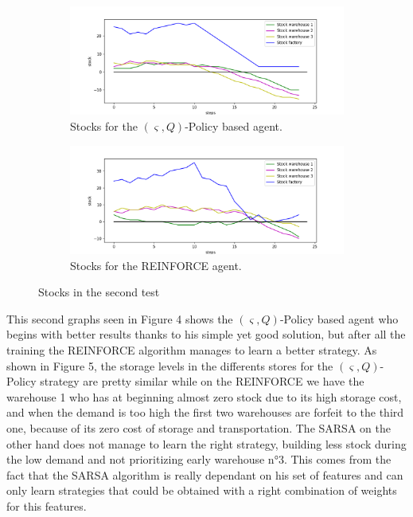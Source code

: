 \documentclass[journal, a4paper]{IEEEtran}
\theoremstyle{plain}
\theoremstyle{definition}
\begin{document}
\begin{figure}
	\raggedleft
	\begin{subfigure}[b]{0.5\textwidth}
		\includegraphics[width=1\columnwidth]{reinforce_stocks.png}
		\caption{Stocks for the $(\varsigma, Q)$-Policy based agent.}
		\label{reinforce_stocks}
	\end{subfigure}
	\begin{subfigure}[b]{0.5\textwidth}
		\includegraphics[width=1\columnwidth]{s_q_stocks.png}
		\caption{ Stocks for the REINFORCE agent.}
		\label{s_q_stocks}
	\end{subfigure}
	\caption{Stocks in the second test}\label{fig:animals}
	 \vspace{-10pt}
\end{figure}
This second graphs seen in Figure 4 shows the $(\varsigma, Q)$-Policy based agent who begins with better results thanks to his simple yet good solution, but after all the training the REINFORCE algorithm manages to learn a better strategy. As shown in Figure 5, the storage levels in the differents stores for the $(\varsigma, Q)$-Policy strategy are pretty similar while on the REINFORCE we have the warehouse 1 who has at beginning almost zero stock due to its high storage cost, and when the demand is too high the first two warehouses are forfeit to the third one, because of its zero cost of storage and transportation. \newline
The SARSA on the other hand does not manage to learn the right strategy, building less stock during the low demand and not prioritizing early warehouse n°3. This comes from the fact that the SARSA algorithm is really dependant on his set of features and can only learn strategies that could be obtained with a right combination of weights for this features.
\end{document}
